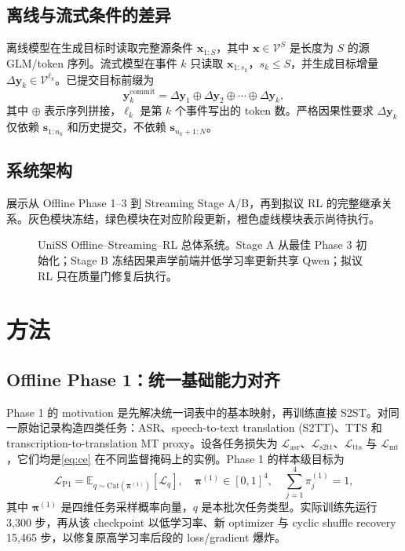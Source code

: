\documentclass[11pt,a4paper]{article}
\newcommand{\vect}[1]{\bm{#1}}
\newcommand{\Vocab}{\mathcal{V}}
\newcommand{\Loss}{\mathcal{L}}
\newcommand{\E}{\mathbb{E}}
\begin{document}
\subsection{离线与流式条件的差异}

离线模型在生成目标时读取完整源条件 $\vect{x}_{1:S}$，其中 $\vect{x}\in\Vocab^S$ 是长度为 $S$ 的源 GLM/token 序列。流式模型在事件 $k$ 只读取 $\vect{x}_{1:s_k}$，$s_k\leq S$，并生成目标增量 $\Delta\vect{y}_k\in\Vocab^{\ell_k}$。已提交目标前缀为
\begin{equation}
  \vect{y}^{\mathrm{commit}}_k
  =\Delta\vect{y}_1\oplus\Delta\vect{y}_2\oplus\cdots\oplus\Delta\vect{y}_k,
  \label{eq:commit}
\end{equation}
其中 $\oplus$ 表示序列拼接，$\ell_k$ 是第 $k$ 个事件写出的 token 数。严格因果性要求 $\Delta\vect{y}_k$ 仅依赖 $\vect{s}_{1:n_k}$ 和历史提交，不依赖 $\vect{s}_{n_k+1:N}$。

\subsection{系统架构}

 展示从 Offline Phase 1--3 到 Streaming Stage A/B，再到拟议 RL 的完整继承关系。灰色模块冻结，绿色模块在对应阶段更新，橙色虚线模块表示尚待执行。

\begin{figure}[htbp]
  \centering
  \resizebox{\textwidth}{!}{}
  \caption{UniSS Offline--Streaming--RL 总体系统。Stage A 从最佳 Phase 3 初始化；Stage B 冻结因果声学前端并低学习率更新共享 Qwen；拟议 RL 只在质量门修复后执行。}
  \label{fig:architecture}
\end{figure}

\section{方法}

\subsection{Offline Phase 1：统一基础能力对齐}

Phase 1 的 motivation 是先解决统一词表中的基本映射，再训练直接 S2ST。对同一原始记录构造四类任务：ASR、speech-to-text translation (S2TT)、TTS 和 transcription-to-translation MT proxy。设各任务损失为 $\Loss_{\mathrm{asr}}$、$\Loss_{\mathrm{s2tt}}$、$\Loss_{\mathrm{tts}}$ 与 $\Loss_{\mathrm{mt}}$，它们均是\cref{eq:ce} 在不同监督掩码上的实例。Phase 1 的样本级目标为
\begin{equation}
 \Loss_{\mathrm{P1}}
 =\E_{q\sim\mathrm{Cat}(\vect{\pi}^{(1)})}
 \left[\Loss_q\right],
 \quad
 \vect{\pi}^{(1)}\in[0,1]^4,
 \quad \sum_{j=1}^{4}\pi_j^{(1)}=1,
 \label{eq:p1}
\end{equation}
其中 $\vect{\pi}^{(1)}$ 是四维任务采样概率向量，$q$ 是本批次任务类型。实际训练先运行 3,300 步，再从该 checkpoint 以低学习率、新 optimizer 与 cyclic shuffle recovery 15,465 步，以修复原高学习率后段的 loss/gradient 爆炸。
\end{document}
